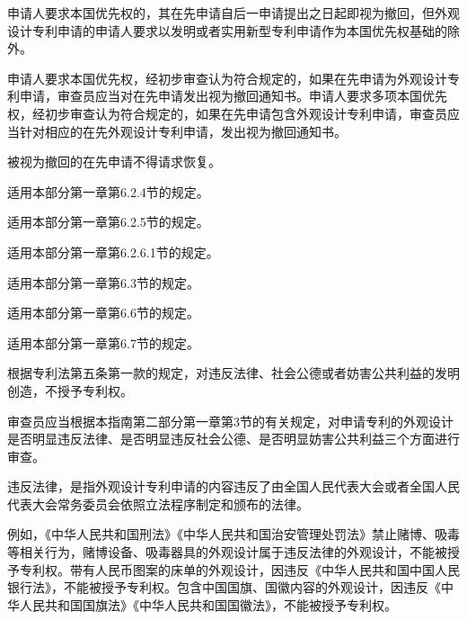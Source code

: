申请人要求本国优先权的，其在先申请自后一申请提出之日起即视为撤回，但外观设计专利申请的申请人要求以发明或者实用新型专利申请作为本国优先权基础的除外。

申请人要求本国优先权，经初步审查认为符合规定的，如果在先申请为外观设计专利申请，审查员应当对在先申请发出视为撤回通知书。申请人要求多项本国优先权，经初步审查认为符合规定的，如果在先申请包含外观设计专利申请，审查员应当针对相应的在先外观设计专利申请，发出视为撤回通知书。

被视为撤回的在先申请不得请求恢复。

适用本部分第一章第6.2.4节的规定。

适用本部分第一章第6.2.5节的规定。

适用本部分第一章第6.2.6.1节的规定。

适用本部分第一章第6.3节的规定。

适用本部分第一章第6.6节的规定。

适用本部分第一章第6.7节的规定。

根据专利法第五条第一款的规定，对违反法律、社会公德或者妨害公共利益的发明创造，不授予专利权。

审查员应当根据本指南第二部分第一章第3节的有关规定，对申请专利的外观设计是否明显违反法律、是否明显违反社会公德、是否明显妨害公共利益三个方面进行审查。

违反法律，是指外观设计专利申请的内容违反了由全国人民代表大会或者全国人民代表大会常务委员会依照立法程序制定和颁布的法律。

例如，《中华人民共和国刑法》《中华人民共和国治安管理处罚法》禁止赌博、吸毒等相关行为，赌博设备、吸毒器具的外观设计属于违反法律的外观设计，不能被授予专利权。带有人民币图案的床单的外观设计，因违反《中华人民共和国中国人民银行法》，不能被授予专利权。包含中国国旗、国徽内容的外观设计，因违反《中华人民共和国国旗法》《中华人民共和国国徽法》，不能被授予专利权。

